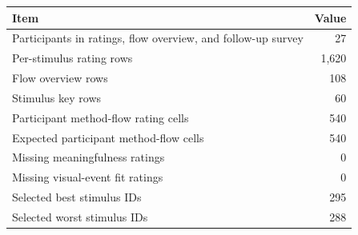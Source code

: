 \begin{appendixtable}
\centering
\small
\caption{Study data quality summary.}
\label{tab:data-quality-summary}
\begin{singlespace}
\renewcommand{\arraystretch}{1.1}
\begin{tabular}{@{}>{\raggedright\arraybackslash}p{2.6in}r@{}}
\hline
\textbf{Item} & \textbf{Value} \\
\hline
Participants in ratings, flow overview, and follow-up survey & 27 \\
Per-stimulus rating rows & 1,620 \\
Flow overview rows & 108 \\
Stimulus key rows & 60 \\
Participant method-flow rating cells & 540 \\
Expected participant method-flow cells & 540 \\
Missing meaningfulness ratings & 0 \\
Missing visual-event fit ratings & 0 \\
Selected best stimulus IDs & 295 \\
Selected worst stimulus IDs & 288 \\
\hline
\end{tabular}
\end{singlespace}
\end{appendixtable}
